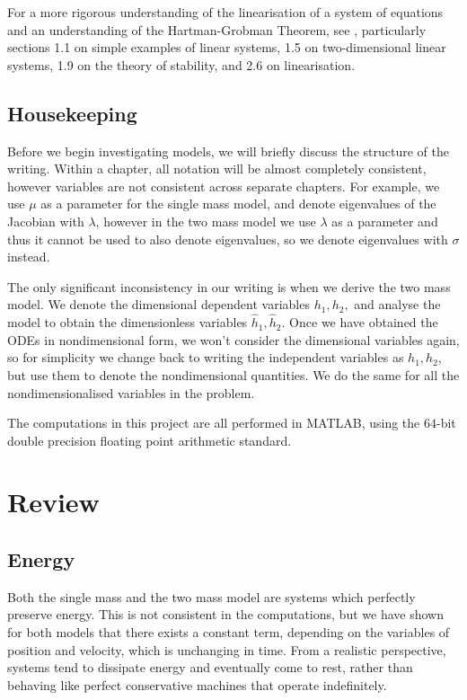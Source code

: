 \documentclass{report}
\begin{document}
For a more rigorous understanding of the linearisation of a system of equations and an understanding of the Hartman-Grobman Theorem,
see \cite{perko_textbook_1996},
particularly sections 1.1 on simple examples of linear systems,
1.5 on two-dimensional linear systems,
1.9 on the theory of stability,
and 2.6 on linearisation.

\section{Housekeeping}

Before we begin investigating models, we will briefly discuss the structure of the writing.
Within a chapter, all notation will be almost completely consistent,
however variables are not consistent across separate chapters.
For example, we use $\mu$ as a parameter for the single mass model,
and denote eigenvalues of the Jacobian with $\lambda$,
however in the two mass model we use $\lambda$ as a parameter and thus it cannot be used to also denote eigenvalues,
so we denote eigenvalues with $\sigma$ instead.

The only significant inconsistency in our writing is when we derive the two mass model.
We denote the dimensional dependent variables $h_1,h_2,$
and analyse the model to obtain the dimensionless variables $\hat{h}_1,\hat{h}_2.$
Once we have obtained the ODEs in nondimensional form,
we won't consider the dimensional variables again,
so for simplicity we change back to writing the independent variables as $h_1,h_2$,
but use them to denote the nondimensional quantities.
We do the same for all the nondimensionalised variables in the problem.

The computations in this project are all performed in MATLAB,
using the $64$-bit double precision floating point arithmetic standard.

%

%

\chapter{Review}

\section{Energy}

Both the single mass and the two mass model are systems which perfectly preserve energy.
This is not consistent in the computations,
but we have shown for both models that there exists a constant term,
depending on the variables of position and velocity,
which is unchanging in time.
From a realistic perspective,
systems tend to dissipate energy and eventually come to rest,
rather than behaving like perfect conservative machines that operate indefinitely.
\end{document}
